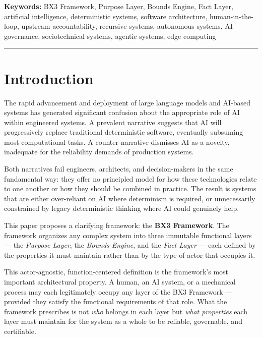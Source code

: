 \documentclass[12pt]{article}
\theoremstyle{plain}
\begin{document}
\vspace{0.5em}
\noindent\textbf{Keywords:} BX3 Framework, Purpose Layer, Bounds Engine, Fact Layer, artificial intelligence, deterministic systems, software architecture, human-in-the-loop, upstream accountability, recursive systems, autonomous systems, AI governance, sociotechnical systems, agentic systems, edge computing

\vspace{1em}
\hrule
\vspace{1em}

\onehalfspacing

\section{Introduction}
\label{sec:intro}

The rapid advancement and deployment of large language models and AI-based systems has generated significant confusion about the appropriate role of AI within engineered systems. A prevalent narrative suggests that AI will progressively replace traditional deterministic software, eventually subsuming most computational tasks. A counter-narrative dismisses AI as a novelty, inadequate for the reliability demands of production systems.

Both narratives fail engineers, architects, and decision-makers in the same fundamental way: they offer no principled model for how these technologies relate to one another or how they should be combined in practice. The result is systems that are either over-reliant on AI where determinism is required, or unnecessarily constrained by legacy deterministic thinking where AI could genuinely help.

This paper proposes a clarifying framework: the \textbf{BX3 Framework}. The framework organizes any complex system into three immutable functional layers --- the \textit{Purpose Layer}, the \textit{Bounds Engine}, and the \textit{Fact Layer} --- each defined by the properties it must maintain rather than by the type of actor that occupies it.

This actor-agnostic, function-centered definition is the framework's most important architectural property. A human, an AI system, or a mechanical process may each legitimately occupy any layer of the BX3 Framework --- provided they satisfy the functional requirements of that role. What the framework prescribes is not \textit{who} belongs in each layer but \textit{what properties} each layer must maintain for the system as a whole to be reliable, governable, and certifiable.
\end{document}
